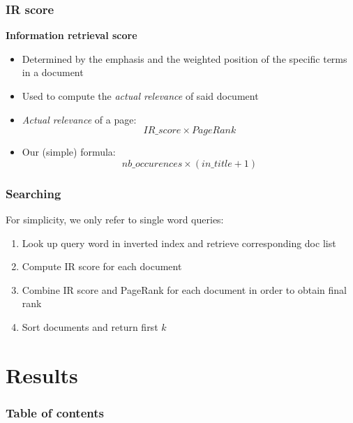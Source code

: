 \documentclass[10pt]{beamer}
\begin{document}
\begin{frame}
  \frametitle{IR score}
  \textbf{Information retrieval score}
  \begin{itemize}
    \item Determined by the emphasis and the weighted position of the specific terms in a document
    \item Used to compute the \emph{actual relevance}  of said document
    \item \emph{Actual relevance} of a page: $$IR\_score \times PageRank$$
    \item Our (simple) formula: $$nb\_occurences \times (in\_title + 1)$$
  \end{itemize}
\end{frame}

\begin{frame}
  \frametitle{Searching}
  For simplicity, we only refer to single word queries:
  \begin{enumerate}
    \item Look up query word in inverted index and retrieve corresponding doc list
    \item Compute IR score for each document
    \item Combine IR score and PageRank for each document in order to obtain final rank
    \item Sort documents and return first $k$
  \end{enumerate}
\end{frame}



\section{Results}

\begin{frame}
  \frametitle{Table of contents}
  \tableofcontents[currentsection]
\end{frame}
\end{document}

